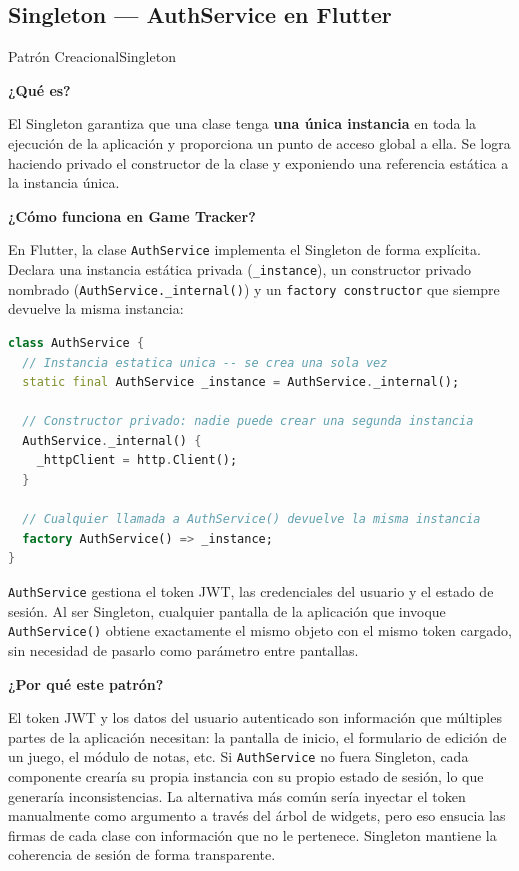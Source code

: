 \subsection{Singleton — AuthService en Flutter}

\begin{patternbox}{Patrón Creacional}{Singleton}

\textbf{¿Qué es?}

El Singleton garantiza que una clase tenga \textbf{una única instancia} en
toda la ejecución de la aplicación y proporciona un punto de acceso global a
ella. Se logra haciendo privado el constructor de la clase y exponiendo una
referencia estática a la instancia única.

\vspace{0.5em}
\textbf{¿Cómo funciona en Game Tracker?}

En Flutter, la clase \texttt{AuthService} implementa el Singleton de forma
explícita. Declara una instancia estática privada (\texttt{\_instance}), un
constructor privado nombrado (\texttt{AuthService.\_internal()}) y un
\texttt{factory constructor} que siempre devuelve la misma instancia:

\begin{lstlisting}[language=Dart]
class AuthService {
  // Instancia estatica unica -- se crea una sola vez
  static final AuthService _instance = AuthService._internal();

  // Constructor privado: nadie puede crear una segunda instancia
  AuthService._internal() {
    _httpClient = http.Client();
  }

  // Cualquier llamada a AuthService() devuelve la misma instancia
  factory AuthService() => _instance;
}
\end{lstlisting}

\texttt{AuthService} gestiona el token JWT, las credenciales del usuario y el
estado de sesión. Al ser Singleton, cualquier pantalla de la aplicación que
invoque \texttt{AuthService()} obtiene exactamente el mismo objeto con el
mismo token cargado, sin necesidad de pasarlo como parámetro entre pantallas.

\vspace{0.5em}
\textbf{¿Por qué este patrón?}

El token JWT y los datos del usuario autenticado son información que múltiples
partes de la aplicación necesitan: la pantalla de inicio, el formulario de
edición de un juego, el módulo de notas, etc. Si \texttt{AuthService} no fuera
Singleton, cada componente crearía su propia instancia con su propio estado de
sesión, lo que generaría inconsistencias. La alternativa más común sería
inyectar el token manualmente como argumento a través del árbol de widgets,
pero eso ensucia las firmas de cada clase con información que no le pertenece.
Singleton mantiene la coherencia de sesión de forma transparente.


\end{patternbox}

